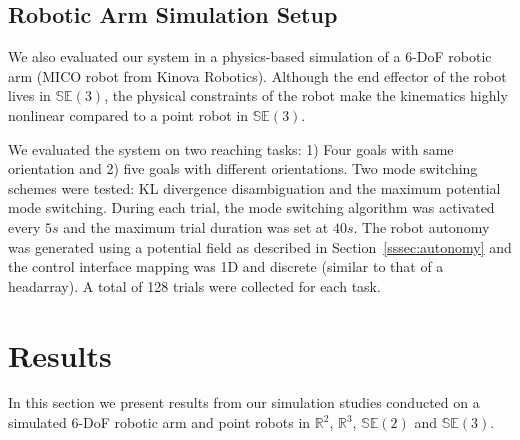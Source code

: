 \documentclass[letterpaper, 10 pt, conference]{ieeeconf}  %
\begin{document}
\subsection{Robotic Arm	 Simulation Setup}
We also evaluated our system in a physics-based simulation of a 6-DoF robotic arm (MICO robot from Kinova Robotics). Although the end effector of the robot lives in $\mathbb{SE}(3)$, the physical constraints of the robot make the kinematics highly nonlinear compared to a point robot in $\mathbb{SE}(3)$. 

We evaluated the system on two reaching tasks: 1) Four goals with same orientation and 2) five goals with different orientations. Two mode switching schemes were tested: KL divergence disambiguation and the maximum potential mode switching. During each trial, the mode switching algorithm was activated every $5s$ and the maximum trial duration was set at $40s$. The robot autonomy was generated using a potential field as described in Section~\ref{sssec:autonomy} and the control interface mapping was 1D and discrete (similar to that of a headarray). A total of 128 trials were collected for each task.

\section{Results}\label{sec:results}

In this section we present results from our simulation studies conducted on a simulated 6-DoF robotic arm and point robots in $\mathbb{R}^2$, $\mathbb{R}^3$, $\mathbb{SE}(2)$ and $\mathbb{SE}(3)$. 
\end{document}
